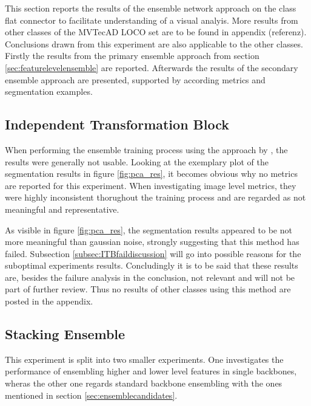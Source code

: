 This section reports the results of the ensemble network approach on the class flat connector to facilitate understanding of a visual 
analyis. More results from other classes of the MVTecAD LOCO \cite{LOCODentsAndScratchesBergmann2022} set are to be found in appendix (referenz). Conclusions drawn from this 
experiment are also applicable to the other classes. Firstly the results from the primary ensemble approach from section \ref{sec:featurelevelensemble} are reported. Afterwards 
the results of the secondary ensemble approach are presented, supported by according metrics and segmentation examples.


\subsection{Independent Transformation Block}
\label{subsec:ITBfail}

When performing the ensemble training process using the approach by \cite{EnsembleHeller2023}, the results were generally not usable. Looking at the exemplary plot of the segmentation 
results in figure \ref{fig:pca_res}, it becomes obvious why no metrics are reported for this experiment. When investigating image level metrics, they were highly inconsistent thorughout 
the training process and are regarded as not meaningful and representative.



As visible in figure \ref{fig:pca_res}, the segmentation results appeared to be not more meaningful than gaussian noise, strongly suggesting that this method has failed. Subsection 
\ref{subsec:ITBfaildiscussion} will go into possible reasons for the suboptimal experiments results. Concludingly it is to be said that these results are, besides the failure analysis 
in the conclusion, not relevant and will not be part of further review. Thus no results of other classes using this method are posted in the appendix.

\subsection{Stacking Ensemble}
\label{subsec:stacking}

This experiment is split into two smaller experiments. One investigates the performance of ensembling higher and lower level features in 
single backbones, wheras the other one regards standard backbone ensembling with the ones mentioned in section \ref{sec:ensemblecandidates}. 

